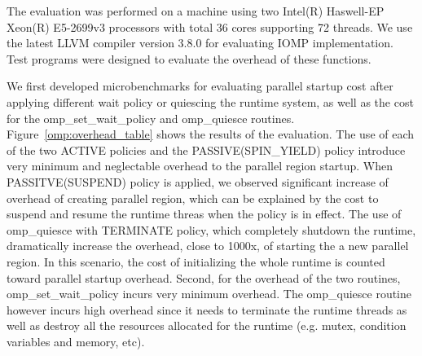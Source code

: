The evaluation was performed on a machine using two Intel(R) Haswell-EP Xeon(R) E5-2699v3 processors with total 36 cores supporting 72 threads. We use the latest
LLVM compiler version 3.8.0 for evaluating IOMP implementation. Test programs were designed to evaluate the overhead of these functions. 

We first developed microbenchmarks for evaluating parallel startup cost after applying different wait policy or 
quiescing the runtime system, as well as the cost for the {\sf omp\_set\_wait\_policy} and {\sf omp\_quiesce} 
routines.  
Figure~\ref{omp:overhead_table} shows the results of the evaluation. 
The use of each of the two {\sf ACTIVE} policies and the PASSIVE(SPIN\_YIELD) policy 
introduce very minimum and neglectable overhead to the {\sf parallel} region startup. 
When PASSITVE(SUSPEND) policy is applied, we observed significant increase of overhead of creating parallel region, 
which can be explained by the cost to suspend and resume the runtime threas when the policy is in effect. 
The use of {\sf omp\_quiesce} with TERMINATE policy, which completely shutdown the 
runtime, dramatically increase the overhead, close to 1000x, of starting the a new parallel region. In this 
scenario, the cost of initializing the whole runtime is counted toward {\sf parallel} startup overhead. Second, 
for the overhead of the two routines, {\sf omp\_set\_wait\_policy} incurs very minimum overhead. The 
{\sf omp\_quiesce} routine however incurs high overhead since it needs to terminate the runtime threads as well as 
destroy all the resources allocated for the runtime (e.g. mutex, condition variables and memory, etc). 



